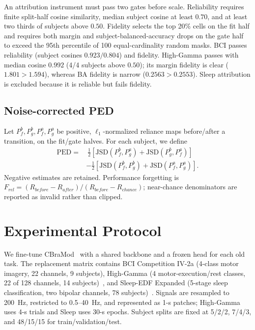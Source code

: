 \documentclass[conference]{IEEEtran}
\begin{document}
An attribution instrument must pass two gates before scale. Reliability requires
finite split-half cosine similarity, median subject cosine at least $0.70$, and
at least two thirds of subjects above $0.50$. Fidelity selects the top 20\%
cells on the fit half and requires both margin and subject-balanced-accuracy
drops on the gate half to exceed the 95th percentile of 100 equal-cardinality
random masks. BCI passes reliability (subject cosines $0.923/0.804$) and
fidelity. High-Gamma passes with median cosine $0.992$ (4/4 subjects above
$0.50$); its margin fidelity is clear ($1.801>1.594$), whereas BA fidelity is
narrow ($0.2563>0.2553$). Sleep attribution is excluded because it is reliable
but fails fidelity.

\subsection{Noise-corrected PED}
Let $P^{b}_{f},P^{b}_{g},P^{a}_{f},P^{a}_{g}$ be positive, $\ell_1$-normalized
reliance maps before/after a transition, on the fit/gate halves. For each
subject, we define
\begin{align}
\mathrm{PED} =&\ \tfrac12\!\left[\mathrm{JSD}(P^{b}_{f},P^{a}_{g})+
\mathrm{JSD}(P^{b}_{g},P^{a}_{f})\right] \nonumber\\
&-\tfrac12\!\left[\mathrm{JSD}(P^{b}_{f},P^{b}_{g})+
\mathrm{JSD}(P^{a}_{f},P^{a}_{g})\right].
\label{eq:ped}
\end{align}
Negative estimates are retained. Performance forgetting is
$F_{rel}=(R_{before}-R_{after})/(R_{before}-R_{chance})$; near-chance
denominators are reported as invalid rather than clipped.

\section{Experimental Protocol}
We fine-tune CBraMod~\cite{wang2025cbramod} with a shared backbone and a frozen
head for each old task. The replacement matrix contains BCI Competition IV-2a
(4-class motor imagery, 22 channels, 9 subjects), High-Gamma
(4 motor-execution/rest classes, 22 of 128 channels, 14 subjects)~\cite{schirrmeister2017},
and Sleep-EDF Expanded (5-stage sleep classification, two bipolar channels, 78
subjects)~\cite{sleepedf}. Signals are resampled to 200~Hz, restricted to
0.5--40~Hz, and represented as 1-s patches; High-Gamma uses 4-s trials and
Sleep uses 30-s epochs. Subject splits are fixed at 5/2/2, 7/4/3, and 48/15/15
for train/validation/test.
\end{document}
